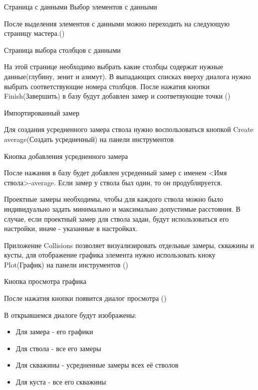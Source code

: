 {Страница с данными}
{Выбор элементов с данными}

После выделения элементов с данными можно переходить на следующую страницу мастера.()

{Страница выбора столбцов с данными}

На этой странице необходимо выбрать какие столбцы содержат нужные данные(глубину, зенит и азимут). В выпадающих списках вверху диалога нужно выбрать соответствующие номера столбцов.
После нажатия кнопки Finish(Завершить) в базу будут добавлен замер и соответвующие точки ()

{Импортированный замер}

Для создания усредненного замера ствола нужно воспользоваться кнопкой Create average(Создать усредненный) на панели инструментов

{Кнопка добавления усредненного замера}

После нажания в базу будет добавлен усреденный замер с именем <Имя ствола>-average. Если замер у ствола был один, то он продублируется.

Проектные замеры необходимы, чтобы для каждого ствола можно было индивидуально задать минимально и максимально допустимые расстояния.
В случае, если проектный замер для ствола задан, будут использоваться его настройки, иначе - указанные в настройках.

Приложение Collisions позволяет визуализировать отдельные замеры, скважины и кусты, для отображение графика элемента нужно использовать кноку Plot(График) на панели инструментов
()

{Кнопка просмотра графика}

После нажатия кнопки появится диалог просмотра ()


В открывшемся диалоге будут изображены:
\begin{itemize}
  \item Для замера - его графики
  \item Для ствола - все его замеры
  \item Для скважины - усредненные замеры всех её стволов
  \item Для куста - все его скважины
\end{itemize}

